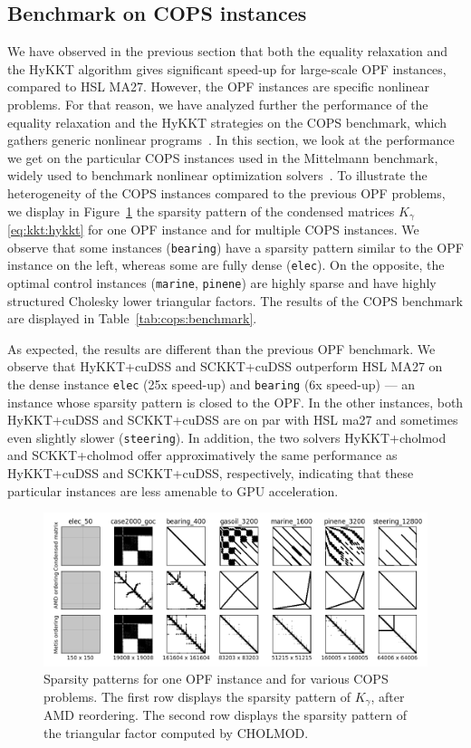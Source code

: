 \subsection{Benchmark on COPS instances}
We have observed in the previous section that both the equality relaxation
and the HyKKT algorithm gives significant speed-up for large-scale
OPF instances, compared to HSL MA27.
However, the OPF instances are specific nonlinear problems.
For that reason, we have analyzed further the performance of
the equality relaxation and the HyKKT strategies on the COPS benchmark,
which gathers generic nonlinear programs~\cite{dolan2004benchmarking}.
In this section, we look at the performance we get on the particular COPS instances used in
the Mittelmann benchmark, widely used to benchmark nonlinear optimization
solvers~\cite{mittelmann2002benchmark}.
To illustrate the heterogeneity of the COPS instances compared to the
previous OPF problems, we display in Figure~\ref{fig:cops:nnz} the sparsity pattern of the
condensed matrices $K_\gamma$ \eqref{eq:kkt:hykkt} for one OPF instance and for multiple
COPS instances. We observe that some instances ({\tt bearing}) have a sparsity pattern
similar to the OPF instance on the left, whereas some are fully dense ({\tt elec}).
On the opposite, the optimal control instances ({\tt marine}, {\tt pinene}) are
highly sparse and have highly structured Cholesky lower triangular factors.
The results of the COPS benchmark are displayed in Table~\ref{tab:cops:benchmark}.

As expected, the results are different than the previous OPF benchmark.
We observe that HyKKT+cuDSS and SCKKT+cuDSS outperform HSL MA27 on the dense instance {\tt elec}
(25x speed-up) and {\tt bearing} (6x speed-up) --- an instance whose sparsity pattern
is closed to the OPF. In the other instances, both HyKKT+cuDSS and SCKKT+cuDSS are
on par with HSL ma27 and sometimes even slightly slower ({\tt steering}).
In addition, the two solvers HyKKT+cholmod and SCKKT+cholmod offer approximatively
the same performance as HyKKT+cuDSS and SCKKT+cuDSS, respectively, indicating that these
particular instances are less amenable to GPU acceleration.

\begin{figure}[!ht]
  \centering
  \includegraphics[width=.9\textwidth]{../figures/sparsity_pattern.png}
  \caption{Sparsity patterns for one OPF instance and for various
    COPS problems. The first row displays the sparsity pattern
    of $K_\gamma$, after AMD reordering. The second row displays
    the sparsity pattern of the triangular factor computed by CHOLMOD.
    \label{fig:cops:nnz}
  }
\end{figure}


